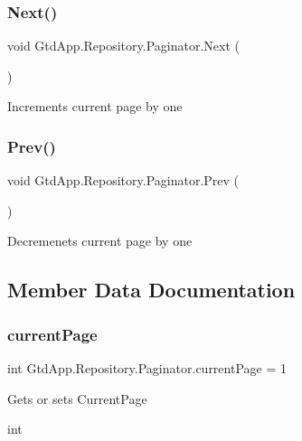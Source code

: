 \subsubsection{Next()}
{\footnotesize\ttfamily void Gtd\+App.\+Repository.\+Paginator.\+Next (\begin{DoxyParamCaption}{ }\end{DoxyParamCaption})}



Increments current page by one 

\mbox{\label{class_gtd_app_1_1_repository_1_1_paginator_a470f4f40477e236284e74f19a204e103}} 
\subsubsection{Prev()}
{\footnotesize\ttfamily void Gtd\+App.\+Repository.\+Paginator.\+Prev (\begin{DoxyParamCaption}{ }\end{DoxyParamCaption})}



Decremenets current page by one 



\subsection{Member Data Documentation}
\mbox{\label{class_gtd_app_1_1_repository_1_1_paginator_a37af977307f502cbdbc704a13262c638}} 
\subsubsection{current\+Page}
{\footnotesize\ttfamily int Gtd\+App.\+Repository.\+Paginator.\+current\+Page = 1\hspace{0.3cm}{\ttfamily [private]}}



Gets or sets Current\+Page 

int\mbox{\label{class_gtd_app_1_1_repository_1_1_paginator_a8c4477dc82c01db4cf89fbd18aeb4482}} 
